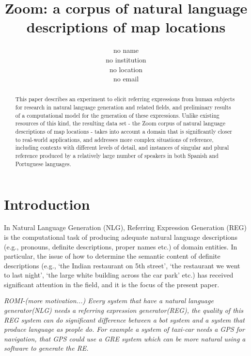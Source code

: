 \documentclass{article}
\title{Zoom: a corpus of natural language descriptions of map locations}
\author{no name \\
no institution\\
no location \\
no email}
\begin{document}
\raggedbottom

\maketitle

\begin{abstract}
This paper describes 
an experiment  to elicit referring expressions
from human subjects 
for research in natural language generation and related fields,
and preliminary results of a computational model 
for the generation of these expressions.
Unlike existing resources of this kind, 
the resulting data set - the Zoom corpus of natural language descriptions of map locations -
takes into account a domain that is significantly closer to real-world applications, 
and addresses more complex situations of reference, including
contexts with different levels of detail, and
instances of singular and plural reference 
produced by a relatively large number of speakers 
in both Spanish and Portuguese languages.
\end{abstract}


\section{Introduction}

In Natural Language Generation (NLG), Referring Expression Generation (REG) is the computational task of producing adequate natural language descriptions (e.g., pronouns, definite descriptions, proper names etc.) of domain entities. In particular, the issue of how to determine the semantic content of definite descriptions (e.g., `the Indian restaurant on 5th street', `the restaurant we went to last night', `the large white building across the car park' etc.) has received significant attention in the field, and it is the focus of the present paper.

{\it ROMI-(more motivation...) Every system that have a natural language generator(NLG) needs a referring expression generator(REG), the quality of this REG system can do significant difference between a bot system and a system that produce language as people do. For example a system of taxi-car needs a GPS for navigation, that GPS could use a GRE system which can be more natural using a software to generate the RE.}
\end{document}
